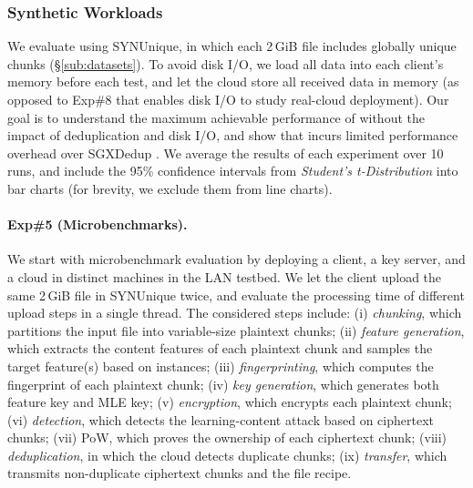 \subsubsection{Synthetic Workloads}
\label{subsub:syn}

We evaluate \prototype using SYNUnique, in which each 2\,GiB file includes globally unique chunks (\S\ref{sub:datasets}).
To avoid disk I/O, we load all data into each client's memory before each test, and let the cloud store all received data in memory (as opposed to Exp\#8 that enables disk I/O to study real-cloud deployment).
Our goal is to understand the maximum achievable performance of \prototype without the impact of deduplication and disk I/O, and show that \prototype incurs limited performance overhead over SGXDedup \cite{ren21}.
We average the results of each experiment over 10 runs, and include the 95\% confidence intervals from {\em Student's t-Distribution} into bar charts (for brevity, we exclude them from line charts).

\paragraph{Exp\#5 (Microbenchmarks).}
We start with microbenchmark evaluation by deploying a client, a key server, and a cloud in distinct machines in the LAN testbed. We let the client upload the same 2\,GiB file in SYNUnique twice, and evaluate the processing time of different upload steps in a single thread. The considered steps include: (i) {\em chunking}, which partitions the input file into variable-size plaintext chunks; (ii) {\em feature generation}, which extracts the content features of each plaintext chunk and samples the target feature(s) based on \sysnameF instances; (iii) {\em fingerprinting}, which computes the fingerprint of each plaintext chunk; (iv) {\em key generation}, which generates both feature key and MLE key; (v) {\em encryption}, which encrypts each plaintext chunk; (vi) {\em detection}, which detects the learning-content attack based on ciphertext chunks; (vii) {PoW}, which proves the ownership of each ciphertext chunk; (viii) {\em deduplication}, in which the cloud detects duplicate chunks; (ix) {\em transfer}, which transmits non-duplicate ciphertext chunks and the file recipe.

